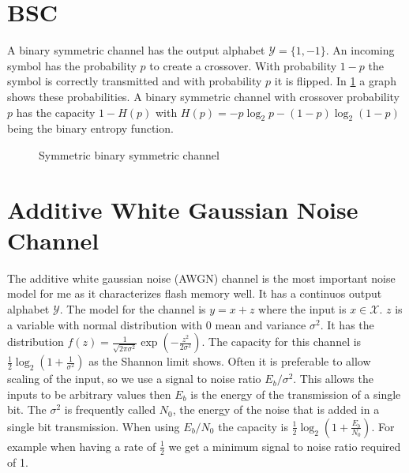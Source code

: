 \section{BSC}
A binary symmetric channel has the output alphabet $\mathcal{Y} = \{1, -1\}$. An incoming symbol has the probability $p$ to create a crossover. With probability $1 - p$ the symbol is correctly transmitted and with probability $p$ it is flipped. In \cref{bsc_schema} a graph shows these probabilities. A binary symmetric channel with crossover probability $p$ has the capacity $1 - H(p)$ with $H(p) = -p \log_2 p - (1 - p) \log_2 (1 - p)$ being the binary entropy function.

\begin{figure}
	\centering
	\caption{Symmetric binary symmetric channel}
	\label{bsc_schema}
\end{figure}

\section{Additive White Gaussian Noise Channel}
The additive white gaussian noise (AWGN) channel is the most important noise model for me as it characterizes flash memory well. It has a continuos output alphabet $\mathcal{Y}$. The model for the channel is $y = x + z$ where the input is $x \in \mathcal{X}$. $z$ is a variable with normal distribution with $0$ mean and variance $\sigma^2$. It has the distribution $f(z) = \frac{1}{\sqrt{2 \pi \sigma^2}}\exp(-\frac{z^2}{2 \sigma^2})$. The capacity for this channel is $\frac{1}{2} \log_2(1 + \frac{1}{\sigma^2})$ as the Shannon limit shows. Often it is preferable to allow scaling of the input, so we use a signal to noise ratio $E_b / \sigma^2$. This allows the inputs to be arbitrary values then $E_b$ is the energy of the transmission of a single bit. The $\sigma^2$ is frequently called $N_0$, the energy of the noise that is added in a single bit transmission. When using $E_b / N_0$ the capacity is $\frac{1}{2} \log_2(1 + \frac{E_b}{N_0})$. For example when having a rate of $\frac{1}{2}$ we get a minimum signal to noise ratio required of 1.

